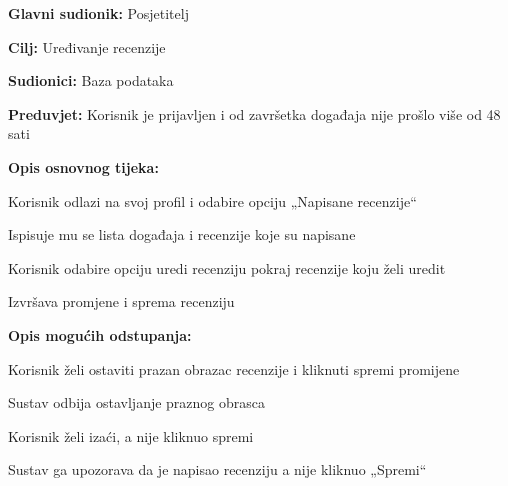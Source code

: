 				\noindent {}
				\begin{packed_item}
					
					\item \textbf{Glavni sudionik: }Posjetitelj
					\item  \textbf{Cilj:} Uređivanje recenzije
					\item  \textbf{Sudionici:} Baza podataka
					\item  \textbf{Preduvjet:} Korisnik je prijavljen i od završetka događaja nije prošlo više od 48 sati
					\item  \textbf{Opis osnovnog tijeka:}
					
					\item[] \begin{packed_enum}
						
						\item Korisnik odlazi na svoj profil i odabire opciju „Napisane recenzije“
						\item Ispisuje mu se lista događaja i recenzije koje su napisane
						\item Korisnik odabire opciju uredi recenziju pokraj recenzije koju želi uredit
						\item Izvršava promjene i sprema recenziju
					\end{packed_enum}
					
					\item  \textbf{Opis mogućih odstupanja:}
					
					\item[] \begin{packed_item}
						
						\item[4.a] Korisnik želi ostaviti prazan obrazac recenzije i kliknuti spremi promijene 
						\item[] \begin{packed_enum}
							\item Sustav odbija ostavljanje praznog obrasca
						\end{packed_enum}
						
						\item[4.b] Korisnik želi izaći, a nije kliknuo spremi  
						\item[] \begin{packed_enum}
							\item Sustav ga upozorava da je napisao recenziju a nije kliknuo „Spremi“
						\end{packed_enum}
						
					\end{packed_item}
				\end{packed_item}
				
